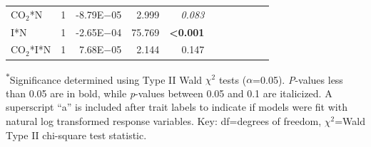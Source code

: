 \begin{landscape}
\begin{table}
{\begin{tabular}{p{3cm}p{0.5cm}p{1.75cm}p{1.5cm}p{1.5cm}p{1.75cm}p{1.5cm}p{1.5cm}p{1.75cm}p{1.5cm}p{1.5cm}}
            CO$_2$*N & \multicolumn{1}{r}{1}
            & \multicolumn{1}{r}{-8.79E$-$05} & \multicolumn{1}{r}{  2.999}   & \multicolumn{1}{r}{\textit{0.083}}
            & \multicolumn{1}{r}{}          & \multicolumn{1}{r}{}          & \multicolumn{1}{r}{}
            & \multicolumn{1}{r}{}          & \multicolumn{1}{r}{}          & \multicolumn{1}{r}{} 
            \\

            I*N & \multicolumn{1}{r}{1}
            & \multicolumn{1}{r}{-2.65E$-$04} & \multicolumn{1}{r}{ 75.769}   & \multicolumn{1}{r}{\textbf{<0.001}}
            & \multicolumn{1}{r}{}          & \multicolumn{1}{r}{}          & \multicolumn{1}{r}{}
            & \multicolumn{1}{r}{}          & \multicolumn{1}{r}{}          & \multicolumn{1}{r}{} 
            \\

            CO$_2$*I*N & \multicolumn{1}{r}{1}
            & \multicolumn{1}{r}{7.68E$-$05}  & \multicolumn{1}{r}{  2.144}   & \multicolumn{1}{r}{0.147}
            & \multicolumn{1}{r}{}          & \multicolumn{1}{r}{}          & \multicolumn{1}{r}{}
            & \multicolumn{1}{r}{}          & \multicolumn{1}{r}{}          & \multicolumn{1}{r}{} 
            \\
            \hline
    \end{tabular}}
    \label{tab:table5.1}
    \end{table}
\begin{singlespace}
    \noindent \textsuperscript{$*$}Significance determined using Type II Wald $\chi^{2}$ tests ($\alpha$=0.05). \textit{P}-values less than 0.05 are in bold, while \textit{p}-values between 0.05 and 0.1 are italicized. A superscript “a” is included after trait labels to indicate if models were fit with natural log transformed response variables. Key: df=degrees of freedom, $\chi^2$=Wald Type II chi-square test statistic.
\end{singlespace}
\end{landscape}
\clearpage

